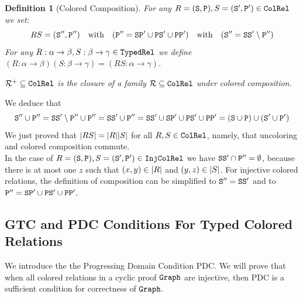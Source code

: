 \documentclass{lmcs}
\newtheorem{definition}[theorem]{Definition}
\begin{document}
 
\begin{definition}[Colored Composition] 
\label{definition-colored-composition}
For any $R = ({\tt S},{\tt P}), S = ({\tt S}',{\tt P}')\in{\tt ColRel}$ we set:
$$
RS = (\Stat'', \Prog'') 
\ \ \  \mbox{with} \ \ \ 
(\Prog'' = \Stat \Prog' \cup \Prog \Stat' \cup \Prog \Prog')
\ \ \  \mbox{with} \ \ \ 
(\Stat'' = \Stat \Stat' \setminus \Prog'')
$$ 
For any $R:\alpha \rightarrow \beta, S:\beta \rightarrow \gamma \in{\tt TypedRel}$ we define
$(R:\alpha \rightarrow \beta)(S:\beta \rightarrow \gamma) = (RS:\alpha \rightarrow \gamma)$.

${\mathcal R}^+ \subseteq {\tt ColRel}$ is the closure of a family ${\mathcal R} \subseteq {\tt ColRel}$ 
under colored composition.
\end{definition}

We deduce that 
$$
{\tt S}'' \cup {\tt P}'' = 
{\tt S} {\tt S}' \setminus {\tt P}'' \cup {\tt P}'' =
{\tt S} {\tt S}' \cup {\tt P}'' =
{\tt S} {\tt S}' \cup {\tt S} {\tt P}' \cup {\tt P} {\tt S}' \cup {\tt P} {\tt P}' = 
({\tt S} \cup {\tt P}) \cup ({\tt S}' \cup {\tt P}')
$$
We just proved that ${| RS |} = {| R |}{| S |}$ for all $R, S \in {\tt ColRel}$, 
namely, that uncoloring and colored composition commute.
\\

In the case of $R = ({\tt S},{\tt P}), S = ({\tt S}',{\tt P}')\in{\tt InjColRel}$ we have 
${\tt S} {\tt S}' \cap {\tt P}'' = \emptyset$, because there is at most one $z$ such that
$(x,y) \in {| R |}$ and $(y,z) \in {| S |}$.
For injective colored relations, 
the definition of composition can be simplified to ${\tt S}'' = {\tt S} {\tt S}'$ and to 
$ {\tt P}'' = {\tt S} {\tt P}' \cup {\tt P} {\tt S}' \cup {\tt P} {\tt P}'$. 


\subsection{GTC and PDC Conditions For  Typed Colored Relations}

We introduce the the Progressing Domain Condition PDC. We will prove that when all colored 
relations in a cyclic proof ${\tt Graph}$ are injective, then PDC is a sufficient condition for 
correctness of ${\tt Graph}$. 
\end{document}
